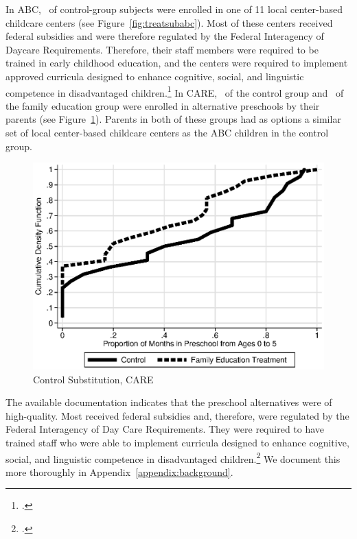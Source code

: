 \noindent In ABC, \treatsubsabc\ of control-group subjects were enrolled in one of 11 local center-based childcare centers (see Figure~\ref{fig:treatsubabc}). Most of these centers received federal subsidies and were therefore regulated by the Federal Interagency of Daycare Requirements. Therefore, their staff members were required to be trained in early childhood education, and the centers were required to implement approved curricula designed to enhance cognitive, social, and linguistic competence in disadvantaged children.\footnote{\citet{Burchinal_etal_1989_CD_Daycare-Pre-K-Dev}.} In CARE, \treatsubscarec\ of the control group and \treatsubscaref\ of the family education group were enrolled in alternative preschools by their parents (see Figure~\ref{fig:treatsubcare}). Parents in both of these groups had as options a similar set of local center-based childcare centers as the ABC children in the control group.

\begin{figure}[H]
		\caption{Control Substitution, CARE} \label{fig:treatsubcare}
		\includegraphics[width=.9\columnwidth]{output/care_controlcontamination_months.eps}
\end{figure}

\noindent The available documentation indicates that the preschool alternatives were of high-quality. Most received federal subsidies and, therefore, were regulated by the Federal Interagency of Day Care Requirements. They were required to have trained staff who were able to implement curricula designed to enhance cognitive, social, and linguistic competence in disadvantaged children.\footnote{\citet{Burchinal_etal_1989_CD_Daycare-Pre-K-Dev}.} We document this more thoroughly in Appendix~\ref{appendix:background}.

